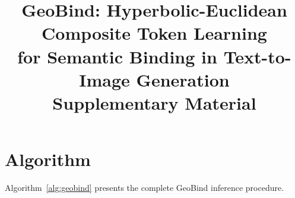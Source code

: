 \documentclass[sigconf,nonacm]{acmart}
\begin{document}
\title{GeoBind: Hyperbolic-Euclidean Composite Token Learning\\for Semantic Binding in Text-to-Image Generation\\
\large Supplementary Material}

\maketitle

\renewcommand{\thesection}{\Alph{section}}
\renewcommand{\thetable}{\Alph{section}\arabic{table}}
\renewcommand{\thefigure}{\Alph{section}\arabic{figure}}
\renewcommand{\theequation}{\Alph{section}.\arabic{equation}}

\section{Algorithm}
\label{sec:algorithm}

Algorithm~\ref{alg:geobind} presents the complete GeoBind inference procedure.
\end{document}
